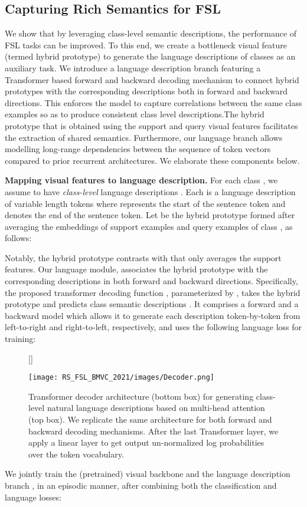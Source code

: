 \documentclass{bmvc2k}
\begin{document}
\subsection{Capturing Rich Semantics for FSL}
\label{subsection:RS_FSL}
We show that by leveraging class-level semantic descriptions, the performance of FSL tasks can be improved. To this end, we create a bottleneck visual feature (termed hybrid prototype) to generate the language descriptions of classes as an auxiliary task. We introduce a language description branch featuring a Transformer based forward and backward decoding mechanism to connect hybrid prototypes with the corresponding descriptions both in forward and backward directions. This enforces the model to capture correlations between the same class examples so as to produce consistent class level descriptions.The hybrid prototype that is obtained using the support and query visual features facilitates the extraction of shared semantics. Furthermore, our language branch allows modelling long-range dependencies between the sequence of token vectors compared to prior recurrent architectures. We elaborate these components below. 

\noindent \textbf{Mapping visual features to language description.}
For each class , we assume to have  \textit{class-level} language descriptions . Each  is a language description of variable length  tokens where  represents the start of the sentence token and  denotes the end of the sentence token. Let  be the hybrid prototype formed after averaging the embeddings of support  examples  and query examples  of class , as follows:
\vspace{-0.5em}

Notably, the hybrid prototype  contrasts with  that only averages the support features. Our language module, associates the hybrid prototype  with the corresponding descriptions  in both forward and backward directions. Specifically, the proposed transformer decoding function , parameterized by , takes the hybrid prototype  and predicts class semantic descriptions . It comprises a forward and a backward model which allows it to generate each description  token-by-token from left-to-right and right-to-left, respectively, and uses the following language loss for training:


\begin{figure}
[\FBwidth]
{\caption{Transformer decoder architecture (bottom box) for generating class-level natural language descriptions based on multi-head attention (top box). We replicate the same architecture for both forward and backward decoding mechanisms. After the last Transformer layer, we apply a linear layer to get output un-normalized log probabilities over the token vocabulary.}\label{fig:transformer_decoder}}
{\texttt{[image: RS\_FSL\_BMVC\_2021/images/Decoder.png]}}
\end{figure}
We jointly train the (pretrained) visual backbone  and the language description branch , in an episodic manner, after combining both the classification and language losses:
\end{document}
